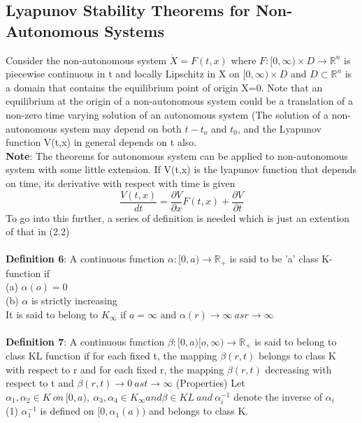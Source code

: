 \documentclass[a4paper,12pt]{report}
\numberwithin{equation}{section}
\begin{document}
\subsection{Lyapunov Stability Theorems for Non-Autonomous Systems}
Consider the non-autonomous system $\dot{X}=F(t,x)$ where $F:[0,\infty) \times D \to \mathbb{R}^{n}$ is piecewise continuous in t and locally Lipschitz in X on $[0,\infty) \times D$ and $D\subset \mathbb{R}^n $ is a domain that contains the equilibrium point of origin X=0. Note that an equilibrium at the origin of a non-autonomous system could be a translation of a non-zero time varying solution of an autonomous system (The solution of a non-autonomous system may depend on both $t-t_{o}$ and $t_{0}$, and the Lyapunov function V(t,x) in general depends on t also. \\
\textbf{Note}: The theorems for autonomous system can be applied to non-autonomous system with some little extension. If V(t,x) is the lyapunov function that depends on time, its derivative with respect with time is given \begin{equation}
\frac{V(t,x)}{dt}=\frac{\partial V}{\partial x}F(t,x)+ \frac{\partial V}{\partial t}
\end{equation}
To go into this further, a series of definition is needed which is just an extention of that in (2.2)\\ \\
\textbf{Definition 6}: A continuous function $ \alpha : [0,a) \to \mathbb{R}_{+} $ is said to be 'a' class K-function if \\
(a) $\alpha (o)=0$ \\
(b) $\alpha$ is strictly increasing  \\
It is said to belong to $ K_{\infty}$ if $ a=\infty$ and $\alpha (r) \to \infty \ as r \to \infty $ \\ \\
\textbf{Definition 7}: A continuous function $\beta : [0, a) [o, \infty) \to \mathbb{R}_{+}$ is said to belong to class KL function if for each fixed t, the mapping $\beta (r,t)$ belongs to class K with respect to r and for each fixed r, the mapping $\beta (r,t) $ decreasing with respect to t and $\beta (r,t)  \to 0 \ as t \to \infty $
\lemma(Properties) Let $\alpha_1 , \alpha_2 \in K \ on \ [0,a), \ \alpha_3, \alpha_4 \in K_{\infty} and \beta \in KL \ and \ \alpha_{i}^{-1}$ denote the inverse of $\alpha_{i} $ \\
(1) $ \alpha_{1}^{-1}$ is defined on $[0,\alpha_{1}(a)) $ and belongs to class K.\\
\end{document}
